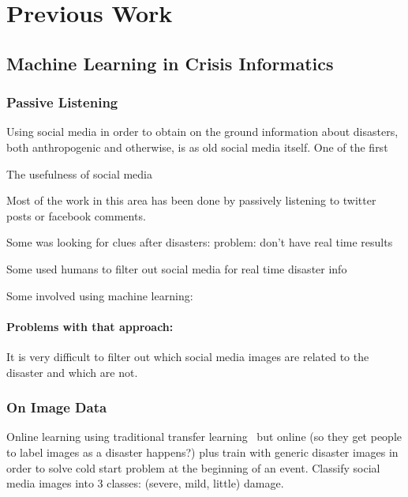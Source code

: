 \chapter{Previous Work} 

\section{Machine Learning in Crisis Informatics}

\subsection{Passive Listening}
Using social media in order to obtain on the ground information about
disasters, both anthropogenic and otherwise, is as old social media itself. One
of the first 


The usefulness of social media


Most of the work in this area has been done by passively listening to twitter
posts or facebook comments. 

Some was looking for clues after disasters: 
\cite{viewegMicrobloggingTwoNatural2010}
problem: don't have real time results

Some used humans to filter out social media for real time disaster info
\cite{starbirdVoluntweetersSelforganizingDigital}
\cite{meierDigitalHumanitariansHow2015}

Some involved using machine learning:
\cite{imranPracticalExtractionDisasterrelevant2013}

\subsubsection{Problems with that approach:}
It is very difficult to filter out which social media images are related to the
disaster and which are not.



\subsection{On Image Data}
Online learning using traditional transfer
learning~\cite{donahueDeCAFDeepConvolutional2013} but online (so they get people
to label images as a disaster happens?) plus train with generic disaster
images in order to solve cold start problem at the beginning of an event.
Classify social media images into 3 classes: (severe, mild, little) damage.
\cite{nguyenDamageAssessmentSocial2017}




